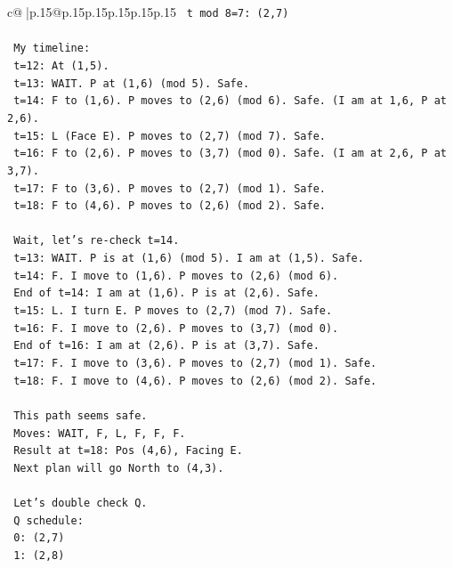 \documentclass{article}
\begin{document}
{\begin{supertabular}{c@{$\;$}|p{.15\linewidth}@{}p{.15\linewidth}p{.15\linewidth}p{.15\linewidth}p{.15\linewidth}p{.15\linewidth}}
{{{\texttt{   t mod 8=7: (2,7)} \\
\\ 
\texttt{   My timeline:} \\
\texttt{   t=12: At (1,5).} \\
\texttt{   t=13: WAIT. P at (1,6) (mod 5). Safe.} \\
\texttt{   t=14: F to (1,6). P moves to (2,6) (mod 6). Safe. (I am at 1,6, P at 2,6).} \\
\texttt{   t=15: L (Face E). P moves to (2,7) (mod 7). Safe.} \\
\texttt{   t=16: F to (2,6). P moves to (3,7) (mod 0). Safe. (I am at 2,6, P at 3,7).} \\
\texttt{   t=17: F to (3,6). P moves to (2,7) (mod 1). Safe.} \\
\texttt{   t=18: F to (4,6). P moves to (2,6) (mod 2). Safe.} \\
\\ 
\texttt{   Wait, let's re{-}check t=14.} \\
\texttt{   t=13: WAIT. P is at (1,6) (mod 5). I am at (1,5). Safe.} \\
\texttt{   t=14: F. I move to (1,6). P moves to (2,6) (mod 6).} \\
\texttt{   End of t=14: I am at (1,6). P is at (2,6). Safe.} \\
\texttt{   t=15: L. I turn E. P moves to (2,7) (mod 7). Safe.} \\
\texttt{   t=16: F. I move to (2,6). P moves to (3,7) (mod 0).} \\
\texttt{   End of t=16: I am at (2,6). P is at (3,7). Safe.} \\
\texttt{   t=17: F. I move to (3,6). P moves to (2,7) (mod 1). Safe.} \\
\texttt{   t=18: F. I move to (4,6). P moves to (2,6) (mod 2). Safe.} \\
\\ 
\texttt{   This path seems safe.} \\
\texttt{   Moves: WAIT, F, L, F, F, F.} \\
\texttt{   Result at t=18: Pos (4,6), Facing E.} \\
\texttt{   Next plan will go North to (4,3).} \\
\\ 
\texttt{   Let's double check Q.} \\
\texttt{   Q schedule:} \\
\texttt{   0: (2,7)} \\
\texttt{   1: (2,8)} \\
}}}
\end{supertabular}}
\end{document}
